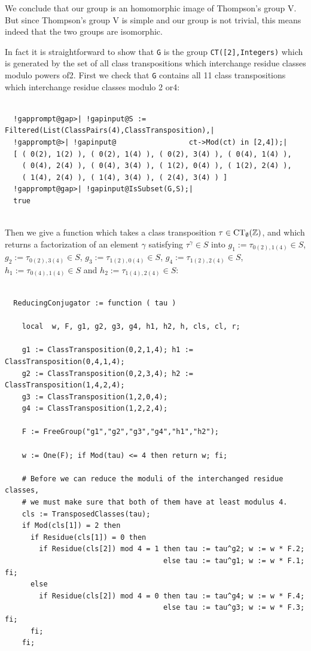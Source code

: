\documentclass[a4paper,11pt]{report}
\begin{document}
{{\begin{Verbatim}[commandchars=!@|,fontsize=\small,frame=single,label=Example]
\end{Verbatim}
 We conclude that our group is an homomorphic image of Thompson's group V. But
since Thompson's group V is simple and our group is not trivial, this means
indeed that the two groups are isomorphic. 

 In fact it is straightforward to show that \texttt{G} is the group \texttt{CT([2],Integers)} which is generated by the set of all class transpositions which interchange
residue classes modulo powers of{\nobreakspace}2. First we check that \texttt{G} contains all 11 class transpositions which interchange residue classes modulo
2 or{\nobreakspace}4: 
\begin{Verbatim}[commandchars=!@|,fontsize=\small,frame=single,label=Example]
  
  !gapprompt@gap>| !gapinput@S := Filtered(List(ClassPairs(4),ClassTransposition),|
  !gapprompt@>| !gapinput@                 ct->Mod(ct) in [2,4]);|
  [ ( 0(2), 1(2) ), ( 0(2), 1(4) ), ( 0(2), 3(4) ), ( 0(4), 1(4) ), 
    ( 0(4), 2(4) ), ( 0(4), 3(4) ), ( 1(2), 0(4) ), ( 1(2), 2(4) ), 
    ( 1(4), 2(4) ), ( 1(4), 3(4) ), ( 2(4), 3(4) ) ]
  !gapprompt@gap>| !gapinput@IsSubset(G,S);|
  true
  
\end{Verbatim}
 Then we give a function which takes a class transposition $\tau \in {\rm CT}_\emptyset({\ensuremath{\mathbb Z}})$, and which returns a factorization of an element $\gamma$ satisfying $\tau^\gamma \in S$ into $g_1 := \tau_{0(2),1(4)} \in S$, $g_2 := \tau_{0(2),3(4)} \in S$, $g_3 := \tau_{1(2),0(4)} \in S$, $g_4 := \tau_{1(2),2(4)} \in S$, $h_1 := \tau_{0(4),1(4)} \in S$ and $h_2 := \tau_{1(4),2(4)} \in S$: 
\begin{Verbatim}[commandchars=!@|,fontsize=\small,frame=single,label=GAP code]
  
  ReducingConjugator := function ( tau )
  
    local  w, F, g1, g2, g3, g4, h1, h2, h, cls, cl, r;
  
    g1 := ClassTransposition(0,2,1,4); h1 := ClassTransposition(0,4,1,4);
    g2 := ClassTransposition(0,2,3,4); h2 := ClassTransposition(1,4,2,4);
    g3 := ClassTransposition(1,2,0,4);
    g4 := ClassTransposition(1,2,2,4);
  
    F := FreeGroup("g1","g2","g3","g4","h1","h2");
  
    w := One(F); if Mod(tau) <= 4 then return w; fi;
  
    # Before we can reduce the moduli of the interchanged residue classes,
    # we must make sure that both of them have at least modulus 4.
    cls := TransposedClasses(tau);
    if Mod(cls[1]) = 2 then
      if Residue(cls[1]) = 0 then
        if Residue(cls[2]) mod 4 = 1 then tau := tau^g2; w := w * F.2;
                                     else tau := tau^g1; w := w * F.1; fi;
      else
        if Residue(cls[2]) mod 4 = 0 then tau := tau^g4; w := w * F.4;
                                     else tau := tau^g3; w := w * F.3; fi;
      fi;
    fi;
  

\end{Verbatim}}}
\end{document}
